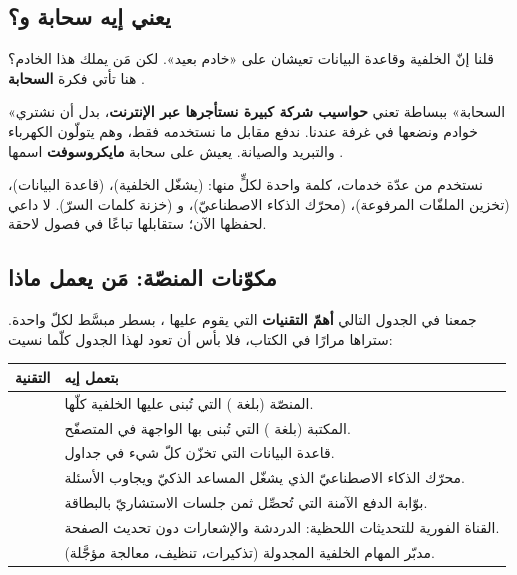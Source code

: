 \subsection{يعني إيه سحابة  و؟}

قلنا إنّ الخلفية وقاعدة البيانات تعيشان على «خادم بعيد». لكن مَن يملك هذا الخادم؟
هنا تأتي فكرة \textbf{السحابة} .

\begin{idea}
«السحابة» ببساطة تعني \textbf{حواسيب شركة كبيرة نستأجرها عبر الإنترنت}، بدل أن نشتري
خوادم ونضعها في غرفة عندنا. ندفع مقابل ما نستخدمه فقط، وهم يتولّون الكهرباء والتبريد
والصيانة.  يعيش على سحابة \textbf{مايكروسوفت} اسمها .
\end{idea}

نستخدم من  عدّة خدمات، كلمة واحدة لكلٍّ منها:  (يشغّل
الخلفية)،  (قاعدة البيانات)،  (تخزين الملفّات
المرفوعة)،  (محرّك الذكاء الاصطناعيّ)، و (خزنة كلمات
السرّ). لا داعي لحفظها الآن؛ ستقابلها تباعًا في فصول لاحقة.

\subsection{مكوّنات المنصّة: مَن يعمل ماذا}

جمعنا في الجدول التالي \textbf{أهمّ التقنيات} التي يقوم عليها ، بسطر
مبسَّط لكلّ واحدة. ستراها مرارًا في الكتاب، فلا بأس أن تعود لهذا الجدول كلّما نسيت:

\begin{center}
\begin{tabular}{L{3cm} L{9.2cm}}
\toprule
\textbf{\color{spPrimary}التقنية} & \textbf{\color{spPrimary}بتعمل إيه} \\
\midrule
{} & المنصّة (بلغة ) التي تُبنى عليها الخلفية كلّها. \\
 & المكتبة (بلغة ) التي تُبنى بها الواجهة في المتصفّح. \\
 & قاعدة البيانات التي تخزّن كلّ شيء في جداول. \\
 & محرّك الذكاء الاصطناعيّ الذي يشغّل المساعد الذكيّ ويجاوب الأسئلة. \\
 & بوّابة الدفع الآمنة التي تُحصِّل ثمن جلسات الاستشاريّ بالبطاقة. \\
 & القناة الفورية للتحديثات اللحظية: الدردشة والإشعارات دون تحديث الصفحة. \\
 & مدبّر المهام الخلفية المجدولة (تذكيرات، تنظيف، معالجة مؤجَّلة). \\
\bottomrule
\end{tabular}
\end{center}

